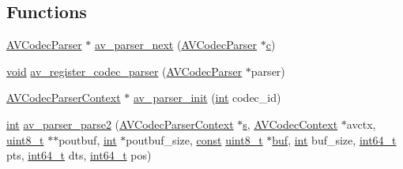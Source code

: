 \subsection*{Functions}
\begin{DoxyCompactItemize}
\item 
\hyperlink{struct_a_v_codec_parser}{A\+V\+Codec\+Parser} $\ast$ \hyperlink{group__lavc__parsing_ga704a268b4d5c6e1318c0a695187f1c8d}{av\+\_\+parser\+\_\+next} (\hyperlink{struct_a_v_codec_parser}{A\+V\+Codec\+Parser} $\ast$\hyperlink{rfft2d_test_m_l_8m_ae0323a9039add2978bf5b49550572c7c}{c})
\item 
\hyperlink{sound_8c_ae35f5844602719cf66324f4de2a658b3}{void} \hyperlink{group__lavc__parsing_ga8258374e31b0afe2d6f7ecf9a34c4810}{av\+\_\+register\+\_\+codec\+\_\+parser} (\hyperlink{struct_a_v_codec_parser}{A\+V\+Codec\+Parser} $\ast$parser)
\item 
\hyperlink{struct_a_v_codec_parser_context}{A\+V\+Codec\+Parser\+Context} $\ast$ \hyperlink{group__lavc__parsing_ga0dd9af605377fcbb49fffd982672d377}{av\+\_\+parser\+\_\+init} (\hyperlink{xmltok_8h_a5a0d4a5641ce434f1d23533f2b2e6653}{int} codec\+\_\+id)
\item 
\hyperlink{xmltok_8h_a5a0d4a5641ce434f1d23533f2b2e6653}{int} \hyperlink{group__lavc__parsing_ga691ca0258e91f99297e7726f56d8c247}{av\+\_\+parser\+\_\+parse2} (\hyperlink{struct_a_v_codec_parser_context}{A\+V\+Codec\+Parser\+Context} $\ast$\hyperlink{lib_2expat_8h_a755339d27872b13735c2cab829e47157}{s}, \hyperlink{struct_a_v_codec_context}{A\+V\+Codec\+Context} $\ast$avctx, \hyperlink{lib-src_2ffmpeg_2win32_2stdint_8h_a9a941819355e6f658991890ff66b4b0e}{uint8\+\_\+t} $\ast$$\ast$poutbuf, \hyperlink{xmltok_8h_a5a0d4a5641ce434f1d23533f2b2e6653}{int} $\ast$poutbuf\+\_\+size, \hyperlink{getopt1_8c_a2c212835823e3c54a8ab6d95c652660e}{const} \hyperlink{lib-src_2ffmpeg_2win32_2stdint_8h_a9a941819355e6f658991890ff66b4b0e}{uint8\+\_\+t} $\ast$\hyperlink{xlstr_8c_a781718f5b53a876fe91c424c4607fa8f}{buf}, \hyperlink{xmltok_8h_a5a0d4a5641ce434f1d23533f2b2e6653}{int} buf\+\_\+size, \hyperlink{lib-src_2ffmpeg_2win32_2stdint_8h_a67a9885ef4908cb72ce26d75b694386c}{int64\+\_\+t} pts, \hyperlink{lib-src_2ffmpeg_2win32_2stdint_8h_a67a9885ef4908cb72ce26d75b694386c}{int64\+\_\+t} dts, \hyperlink{lib-src_2ffmpeg_2win32_2stdint_8h_a67a9885ef4908cb72ce26d75b694386c}{int64\+\_\+t} pos)
\item 
$$
\end{DoxyCompactItemize}
